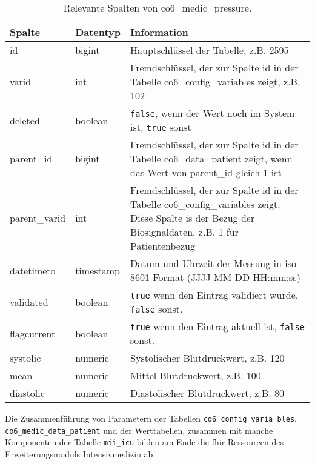 \begin{longtable}{|l|l|p{8cm}|}
	\caption[Relevante Spalten von co6\_medic\_pressure]{Relevante Spalten von co6\_medic\_pressure.}
	\label{tab:valuepress}
	\endfirsthead
		\hline
		\rowcolor{lightgray} Spalte & Datentyp & Information \\ \hline
		id & bigint & Hauptschlüssel der Tabelle, z.B. 2595 \\ \hline
		varid & int & Fremdschlüssel, der zur Spalte id in der Tabelle co6\_config\_variables zeigt, z.B. 102 \\ \hline
		deleted & boolean & \texttt{false}, wenn der Wert noch im System ist, \texttt{true} sonst \\ \hline
		parent\_id & bigint & Fremdschlüssel, der zur Spalte id in der Tabelle co6\_data\_patient zeigt, wenn das Wert von parent\_id gleich 1 ist \\ \hline
		parent\_varid & int & Fremdschlüssel, der zur Spalte id in der Tabelle co6\_config\_variables zeigt. Diese Spalte is der Bezug der Biosignaldaten, z.B. 1 für Patientenbezug \\ \hline
		datetimeto & timestamp & Datum und Uhrzeit der Messung in \acs{iso} 8601 Format (JJJJ-MM-DD HH:mm:ss)\\ \hline
		validated & boolean & \texttt{true} wenn den Eintrag validiert wurde, \texttt{false} sonst. \\ \hline
		flagcurrent & boolean & \texttt{true} wenn den Eintrag aktuell ist, \texttt{false} sonst. \\ \hline
		systolic & numeric & Systolischer Blutdruckwert, z.B. 120 \\ \hline
		mean & numeric & Mittel Blutdruckwert, z.B. 100 \\ \hline
		diastolic & numeric & Diastolischer Blutdruckwert, z.B. 80 \\ \hline
\end{longtable}

Die Zusammenführung von Parametern der Tabellen \texttt{co6\_config\_varia bles}, \texttt{co6\_medic\_data\_patient} und der Werttabellen, zusammen mit manche Komponenten der Tabelle \texttt{mii\_icu} bilden am Ende die \ac{fhir}-Ressourcen des Erweiterungsmoduls \glqq Intensivmedizin\grqq{} ab.